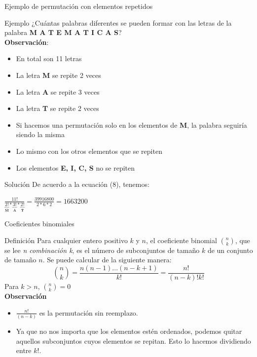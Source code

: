 \documentclass{beamer}
\begin{document}
\begin{frame}{Ejemplo de permutación con elementos repetidos}
  \begin{exampleblock}{Ejemplo}
    ¿Cuántas palabras diferentes se pueden formar con las letras de la palabra
    \textbf{M A T E M A T I C A S}?\\
    \textbf{Observación}:
    \begin{itemize}
      \item En total son 11 letras
       \item La letra \textbf{M} se repite 2 veces
       \item La letra \textbf{A} se repite 3 veces
       \item La letra \textbf{T} se repite 2 veces
       \item Si hacemos una permutación solo en los elementos de \textbf{M}, la palabra
      seguiría siendo la misma
       \item Lo mismo con los otros elementos que se repiten
       \item Los elementos \textbf{E, I, C, S} no se repiten
    \end{itemize}
  \end{exampleblock}

\end{frame}

\begin{frame}{Solución}
  De acuerdo a la ecuación (8), tenemos:  %
  \begin{exampleblock}{}
    \centering
$\frac{11!}{\underbrace{2!}_{\textbf{M}}*\underbrace{3!}_{\textbf{A}}*\underbrace{2!}_{\textbf{T}}}
    = \frac{39916800}{2*6*2}=1663200$
  \end{exampleblock}
\end{frame}

\begin{frame}{Coeficientes binomiales}
  \begin{block}{Definición}
    Para cualquier entero positivo $k$ y $n$, el coeficiente binomial
    $\binom{n}{k}$, que se lee \textit{n combinación k}, es el número de
    subconjuntos de tamaño $k$ de un conjunto de tamaño $n$. Se puede calcular de la
    siguiente manera:
  \begin{equation}
    \binom{n}{k} = \frac{n(n-1)...(n-k+1)}{k!} = \frac{n!}{(n-k)!k!}
    \label{eq:binomial}
  \end{equation}
  Para $k>n$, $\binom{n}{k}=0$ \\
  \textbf{Observación}\\
  \begin{itemize}
    \item $\frac{n!}{(n-k)}$ es la permutación sin reemplazo.
     \item Ya que no nos importa que los elementos estén ordenados,
    podemos quitar aquellos subconjuntos cuyos elementos se repitan. Esto lo hacemos
    dividiendo entre $k!$.
  \end{itemize}
\end{block}
\end{frame}
\end{document}
